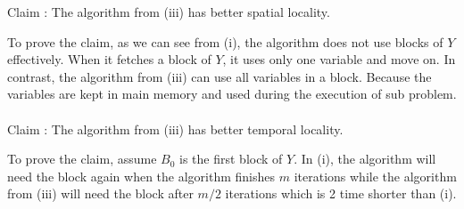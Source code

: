 Claim : The algorithm from (iii) has better spatial locality.

To prove the claim, as we can see from (i), the algorithm does not use blocks of $Y$ effectively. When it fetches a block of $Y$, it uses only one variable and move on. In contrast, the algorithm from (iii) can use all variables in a block. Because the variables are kept in main memory and used during the execution of sub problem.
\\\\
Claim : The algorithm from (iii) has better temporal locality. 

To prove the claim, assume $B_0$ is the first block of $Y$. In (i), the algorithm will need the block again when the algorithm finishes $m$ iterations while the algorithm from (iii) will need the block after $m/2$ iterations which is 2 time shorter than (i).
